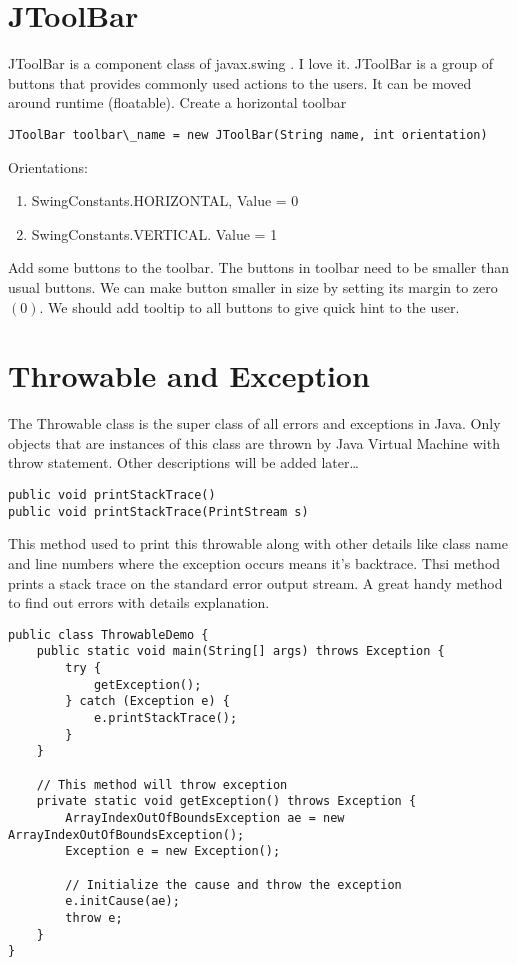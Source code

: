 \documentclass[10 pt]{article}
\newcommand{\I}{\item}
\begin{document}
\section{JToolBar}
JToolBar is a component class of javax.swing . I love it. JToolBar is a group of buttons that provides commonly used actions to the users. It can be moved around runtime (floatable). Create a horizontal toolbar
\begin{lstlisting}
JToolBar toolbar\_name = new JToolBar(String name, int orientation)
\end{lstlisting}
Orientations:
\begin{enumerate}
	\I SwingConstants.HORIZONTAL, Value = 0
	\I SwingConstants.VERTICAL. Value = 1
\end{enumerate}

Add some buttons to the toolbar. The buttons in toolbar need to be smaller than usual buttons. We can make button smaller in size by setting its margin to zero $(0)$. We should add tooltip to all buttons to give quick hint to the user.

\section{Throwable and Exception}
The Throwable class is the super class of all errors and exceptions in Java. Only objects that are instances of this class are thrown by Java Virtual Machine with throw statement. Other descriptions will be added later\dots
\begin{lstlisting}
public void printStackTrace()
public void printStackTrace(PrintStream s)
\end{lstlisting}
This method used to print this throwable along with other details like class name and line numbers where the exception occurs means it's backtrace. Thsi method prints a stack trace on the standard error output stream. A great handy method to find out errors with details explanation.
\begin{lstlisting}
public class ThrowableDemo {
    public static void main(String[] args) throws Exception {
        try {
            getException();
        } catch (Exception e) {
            e.printStackTrace();
        }
    }

    // This method will throw exception
    private static void getException() throws Exception {
        ArrayIndexOutOfBoundsException ae = new ArrayIndexOutOfBoundsException();
        Exception e = new Exception();

        // Initialize the cause and throw the exception
        e.initCause(ae);
        throw e;
    }
}
\end{lstlisting}
\end{document}
